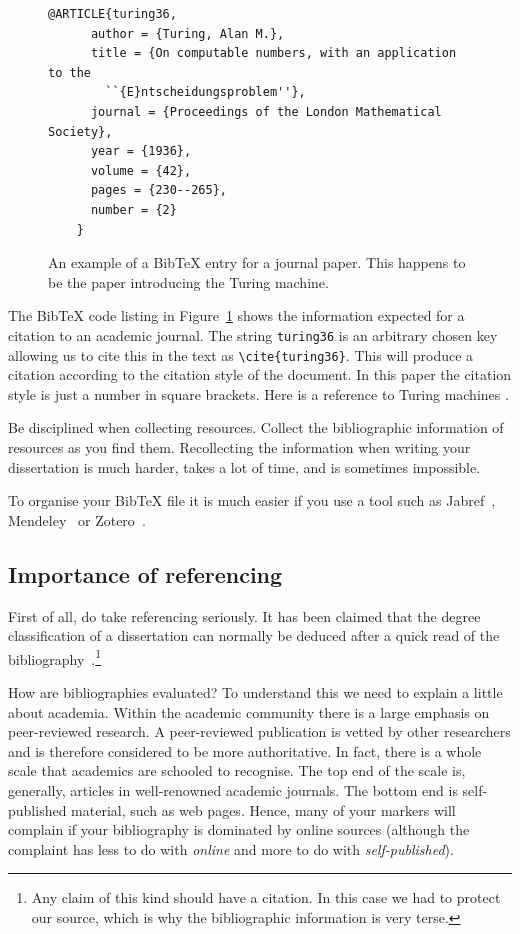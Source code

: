 \documentclass[12pt]{article}
\theoremstyle{plain}
\theoremstyle{definition}
\begin{document}
\begin{figure}[ht]
  \centering
  \begin{lstlisting}[gobble=4]
    @ARTICLE{turing36,
      author = {Turing, Alan M.},
      title = {On computable numbers, with an application to the
        ``{E}ntscheidungsproblem''},
      journal = {Proceedings of the London Mathematical Society},
      year = {1936},
      volume = {42},
      pages = {230--265},
      number = {2}
    }
  \end{lstlisting}
    
  \caption[A BibTeX entry.]{\small An example of a BibTeX entry for a
    journal paper. This happens to be the paper introducing the
    Turing machine.}
  \label{fig:bibtex}
\end{figure}

The BibTeX code listing in Figure~\ref{fig:bibtex} shows the
information expected for a citation to an academic journal. The string
\texttt{turing36} is an arbitrary chosen key allowing us to cite this in
the text as \verb|\cite{turing36}|. This will produce a citation
according to the citation style of the document. In this paper the
citation style is just a number in square brackets. Here is a
reference to Turing machines \cite{turing36}.

Be disciplined when collecting resources. Collect the bibliographic
information of resources as you find them. Recollecting the
information when writing your dissertation is much harder, takes a lot
of time, and is sometimes impossible.

To organise your BibTeX file it is much easier if you use a tool such
as Jabref~\cite{jabref}, Mendeley~\cite{mendeley} or Zotero~\cite{zotero}.

\subsection{Importance of referencing}

First of all, do take referencing seriously. It has been claimed that
the degree classification of a dissertation can normally be deduced
after a quick read of the
bibliography~\cite{bibliography}.\footnote{Any claim of this kind
  should have a citation. In this case we had to protect our source,
  which is why the bibliographic information is very terse.}

How are bibliographies evaluated? To understand this we need to
explain a little about academia. Within the academic community there
is a large emphasis on peer-reviewed research. A peer-reviewed
publication is vetted by other researchers and is therefore considered
to be more authoritative. In fact, there is a whole scale that
academics are schooled to recognise. The top end of the scale is,
generally, articles in well-renowned academic journals. The bottom end
is self-published material, such as web pages. Hence, many of your
markers will complain if your bibliography is dominated by online
sources (although the complaint has less to do with \emph{online} and
more to do with \emph{self-published}).
\end{document}
